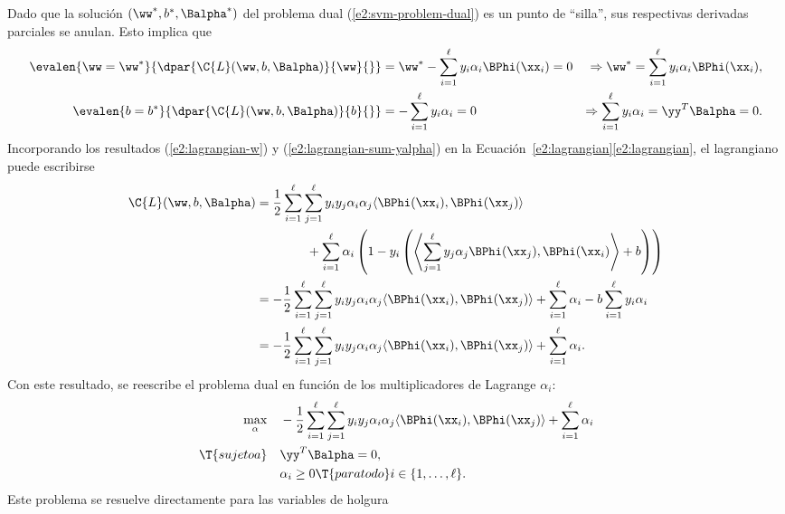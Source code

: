 Dado que la solución $(\ww^*,b^*,\Balpha^*)$ del problema dual
(\ref{e2:svm-problem-dual}) es un punto de ``silla'', sus respectivas
derivadas parciales se anulan. Esto implica que
%
\begin{align}\label{e2:lagrangian-w}
  \evalen{\ww=\ww^*}{\dpar{\C{L}(\ww,b,\Balpha)}{\ww}{}}
    &=\ww^*-\sum_{i=1}^\ell y_i\alpha_i\BPhi(\xx_i) = 0
    &\Rightarrow \ww^* = \sum_{i=1}^\ell y_i\alpha_i\BPhi(\xx_i),
  \\
  \label{e2:lagrangian-sum-yalpha}
  \evalen{b=b^*}{\dpar{\C{L}(\ww,b,\Balpha)}{b}{}}
    &=-\sum_{i=1}^\ell y_i\alpha_i = 0
      &\Rightarrow \sum_{i=1}^\ell y_i\alpha_i = \yy^T\Balpha = 0.
\end{align}
%
Incorporando los resultados (\ref{e2:lagrangian-w}) y
(\ref{e2:lagrangian-sum-yalpha}) en la
\iflatexml{}Ecuación~\ref{e2:lagrangian}\else\autoref{e2:lagrangian}\fi,
el lagrangiano puede escribirse
%
\begin{align*}
  \C{L}(\ww,b,\Balpha)
  & =
    \frac{1}{2}\sum_{i=1}^\ell\sum_{j=1}^\ell y_iy_j\alpha_i\alpha_j
    \langle\BPhi(\xx_i),\BPhi(\xx_j)\rangle \\
    &\qquad\qquad +
    \sum_{i=1}^{\ell} \alpha_i \left(1-y_i\left(\left\langle
    \sum_{j=1}^\ell y_j\alpha_j\BPhi(\xx_j) ,\BPhi(\xx_i)\right\rangle
    +b\right)\right)\\
  & =
    -\frac{1}{2}\sum_{i=1}^\ell\sum_{j=1}^\ell y_iy_j\alpha_i\alpha_j
    \langle\BPhi(\xx_i),\BPhi(\xx_j)\rangle +
    \sum_{i=1}^{\ell} \alpha_i  - b \sum_{i=1}^\ell y_i\alpha_i \\
 & =
    -\frac{1}{2}\sum_{i=1}^\ell\sum_{j=1}^\ell y_iy_j\alpha_i\alpha_j
    \langle\BPhi(\xx_i),\BPhi(\xx_j)\rangle +
    \sum_{i=1}^{\ell} \alpha_i  .
\end{align*}
%
Con este resultado, se reescribe el problema dual en función de los
multiplicadores de Lagrange $\alpha_i$:
%
\begin{align}
  \begin{split}
    \max_\alpha &\quad
    -\frac{1}{2}\sum_{i=1}^\ell\sum_{j=1}^\ell y_iy_j\alpha_i\alpha_j
    \langle \BPhi(\xx_i),\BPhi(\xx_j) \rangle +
    \sum_{i=1}^{\ell} \alpha_i \\
    \T{sujeto a} &\quad \yy^T\Balpha = 0, \\
    &\quad \alpha_i \geq 0\T{ para todo } i\in\{1,\ldots,\ell\}.
  \end{split}
  \label{e2:svm-problem-dual2}
\end{align}
%
Este problema se resuelve directamente para las variables de holgura
